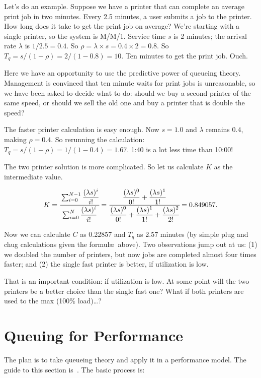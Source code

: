 \documentclass[a4paper]{report}
\begin{document}
Let's do an example. Suppose we have a printer that can complete an average print job in two minutes. Every 2.5 minutes, a user submits a job to the printer. How long does it take to get the print job on average? We're starting with a single printer, so the system is M/M/1. Service time $s$ is 2 minutes; the arrival rate $\lambda$ is $1/2.5 = 0.4$. So $\rho = \lambda \times s = 0.4 \times 2 = 0.8$. So $T_{q} = s / (1 - \rho ) = 2 / (1 -0.8 ) = 10$. Ten minutes to get the print job. Ouch.

Here we have an opportunity to use the predictive power of queueing theory. Management is convinced that ten minute waits for print jobs is unreasonable, so we have been asked to decide what to do: should we buy a second printer of the same speed, or should we sell the old one and buy a printer that is double the speed?

The faster printer calculation is easy enough. Now $s = 1.0$ and $\lambda$ remains $0.4$, making $\rho = 0.4$. So rerunning the calculation: $T_{q} = s / (1 - \rho ) = 1 / (1 - 0.4 ) = 1.67$. 1:40 is a lot less time than 10:00! 

The two printer solution is more complicated. So let us calculate $K$ as the intermediate value. 

\[K = \cfrac{\sum_{i=0}^{N-1}\dfrac{(\lambda s)^{i}}{i!}}{{\sum_{i=0}^{N}\dfrac{(\lambda s)^{i}}{i!}}} = \cfrac{\dfrac{(\lambda s)^{0}}{0!} + \dfrac{(\lambda s)^{1}}{1!}}{\dfrac{(\lambda s)^{0}}{0!} + \dfrac{(\lambda s)^{1}}{1!} + \dfrac{(\lambda s)^{2}}{2!}} = 0.849057.\]

Now we can calculate $C$ as 0.22857 and $T_{q}$ as 2.57 minutes (by simple plug and chug calculations given the formul\ae\  above). Two observations jump out at us: (1) we doubled the number of printers, but now jobs are completed almost four times faster; and (2) the single fast printer is better, if utilization is low.

That is an important condition: if utilization is low. At some point will the two printers be a better choice than the single fast one? What if both printers are used to the max (100\% load)\ldots?

\section*{Queuing for Performance}

The plan is to take queueing theory and apply it in a performance model. The guide to this section is~\cite{williams-perf}. The basic process is:
\end{document}
